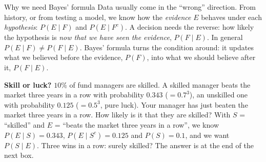 \begin{key}{Why we need Bayes' formula}
	\setlength{\parskip}{5pt}
	Data usually come in the ``wrong'' direction. From history, or from
	testing a model, we know how the \emph{evidence} $E$ behaves under each
	\emph{hypothesis}: $P(E\mid F)$ and $P(E\mid F^c)$. A decision needs the
	reverse: how likely the hypothesis is \emph{now that we have seen the
		evidence}, $P(F\mid E)$. In general $P(E\mid F)\ne P(F\mid E)$. Bayes'
	formula turns the condition around: it updates what we believed before
	the evidence, $P(F)$, into what we should believe after it, $P(F\mid E)$.

	\textbf{Skill or luck?} $10\%$ of fund managers are skilled. A skilled
	manager beats the market three years in a row with probability $0.343$
	($=0.7^3$), an unskilled one with probability $0.125$ ($=0.5^3$, pure
	luck). Your manager has just beaten the market three years in a row. How
	likely is it that they are skilled? With $S$ = ``skilled'' and $E$ =
	``beats the market three years in a row'', we know $P(E\mid S)=0.343$,
	$P(E\mid S^c)=0.125$ and $P(S)=0.1$, and we want $P(S\mid E)$. Three wins
	in a row: surely skilled? The answer is at the end of the next box.
\end{key}

